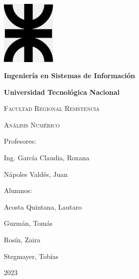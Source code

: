 \documentclass[12pt, twocolumn]{article}
\title{}
\begin{document}
\begin{titlepage}
\centering
{\includegraphics[width=0.2\textwidth]{../../utnlogo.png}\par}
\vspace{1cm}
{\bfseries\LARGE Ingeniería en Sistemas de Información\par}
\vspace{0.5cm}
{\bfseries\LARGE Universidad Tecnológica Nacional\par}
\vspace{1cm}
{\scshape\Large Facultad Regional Resistencia \par}
\vspace{1cm}
{\scshape\Huge Análisis Numérico \par}
\vspace{1cm}
\vfill
{\Large Profesores:\par}
{\Large Ing. García Claudia, Roxana \par}
{\Large Nápoles Valdés, Juan \par}
\vfill
{\Large Alumnos:\par}
{\Large Acosta Quintana, Lautaro \par}
{\Large Guzmán, Tomás \par}
{\Large Rosín, Zaira \par}
{\Large Stegmayer, Tobías \par}
\vfill
{\Large 2023\par}
\end{titlepage}
\end{document}
